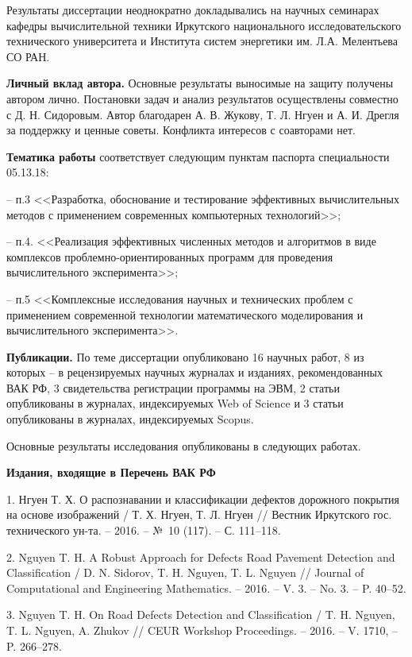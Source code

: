 Результаты диссертации неоднократно докладывались на научных семинарах кафедры вычислительной техники Иркутского национального исследовательского технического университета и Института систем энергетики им. Л.А. Мелентьева СО РАН.

\textbf{Личный вклад автора.} Основные результаты выносимые на защиту получены автором лично. Постановки задач и анализ результатов осуществлены совместно с Д. Н. Сидоровым. Автор благодарен А. В. Жукову, Т. Л. Нгуен и А. И. Дрегля за поддержку и ценные советы. Конфликта интересов с соавторами нет.

\textbf{Тематика работы} соответствует следующим пунктам паспорта специальности 05.13.18:

-- п.3 <<Разработка, обоснование и тестирование эффективных вычислительных методов с применением современных компьютерных технологий>>;

-- п.4. <<Реализация эффективных численных методов и алгоритмов в виде комплексов проблемно-ориентированных программ для проведения вычислительного эксперимента>>;

-- п.5 <<Комплексные исследования научных и технических проблем с применением современной технологии математического моделирования и вычислительного эксперимента>>.

\textbf{Публикации.} По теме диссертации опубликовано 16 научных работ, 8 из которых – в рецензируемых научных журналах и изданиях, рекомендованных ВАК РФ, 3 свидетельства регистрации программы на ЭВМ, 2 статьи опубликованы в журналах, индексируемых Web of Science и 3 статьи опубликованы в журналах, индексируемых Scopus.

Основные результаты исследования опубликованы в следующих работах.

\textbf{Издания, входящие в Перечень ВАК РФ}

1. Нгуен Т. Х. О распознавании и классификации дефектов дорожного покрытия на основе изображений / Т. Х. Нгуен, Т. Л. Нгуен // Вестник Иркутского гос. технического ун-та. -- 2016. -- №~10 (117). -- С. 111--118.

2. Nguyen T. H. A Robust Approach for Defects Road Pavement Detection and Classification / D. N. Sidorov, T. H. Nguyen, T. L. Nguyen // Journal of Computational and Engineering Mathematics. -- 2016. -- V. 3. -- No. 3. -- P. 40--52.

3. Nguyen T. H. On Road Defects Detection and Classification / T. H. Nguyen, T. L. Nguyen, A. Zhukov // CEUR Workshop Proceedings. -- 2016. -- V. 1710, -- P. 266--278.

